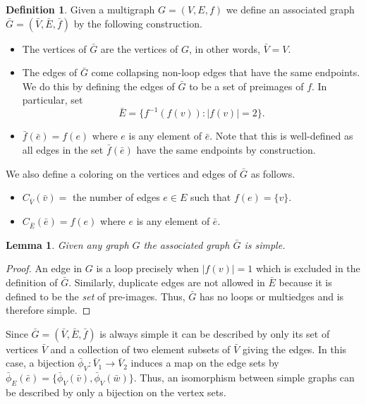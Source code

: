\documentclass[amsmath,secnumarabic,floatfix,amssymb,nofootinbib,nobibnotes,letterpaper,11pt,tightenlines,showkeys]{revtex4}
\newtheorem{lemma}[theorem]{Lemma}
\theoremstyle{definition}
\newtheorem{definition}[theorem]{Definition}
\newcommand{\abs}[1]{\lvert#1\rvert}
\let\mgp=\marginpar \marginparwidth18mm \marginparsep1mm
\def\marginpar#1{\mgp{\raggedright\tiny #1}}
\let\lbl=\label
\def\label#1{\lbl{#1}\ifinner\else\marginpar{\ref{#1} #1}\ignorespaces\fi}
\begin{document}
\begin{definition}{\label{gbar}}
	Given a multigraph $G=(V,E,f)$ we define an associated graph $\bar{G} = (\bar{V}, \bar{E}, \bar{f})$ by the following construction. 

	\begin{itemize}
		\item The vertices of $\bar{G}$ are the vertices of $G$, in other words, $\bar{V} = V$.
		\item The edges of $\bar{G}$ come collapsing non-loop edges that have the same endpoints. We do this by defining the edges of $\bar{G}$ to be a set of preimages of $f$. In particular, set $$\bar{E} =  \{f^{-1}(f(v)) : \abs{f(v)} = 2\}.$$
		\item $\bar{f}(\bar{e}) = f(e)$ where $e$ is any element of $\bar{e}$. Note that this is well-defined as all edges in the set $\bar{f}(\bar{e})$ have the same endpoints by construction.
		
	\end{itemize}

	We also define a coloring on the vertices and edges of $\bar{G}$ as follows.
	
	\begin{itemize}
		\item $C_{\bar{V}}(\bar{v}) = $ the number of edges $e \in E$ such that $f(e) = \{v\}$.
		\item $C_{\bar{E}}(\bar{e}) = f(e)$ where $e$ is any element of $\bar{e}$.
	\end{itemize}

\end{definition}

\begin{lemma}
	Given any graph $G$ the associated graph $\bar{G}$ is simple.
\end{lemma}

\begin{proof}
	An edge in $G$ is a loop precisely when $\abs{f(v)} = 1$ which is excluded in the definition of $\bar{G}$. Similarly, duplicate edges are not allowed in $\bar{E}$ because it is defined to be the \emph{set} of pre-images. Thus, $\bar{G}$ has no loops or multiedges and is therefore simple.
\end{proof}

Since $\bar{G} = (\bar{V}, \bar{E}, \bar{f})$ is always simple it can be described by only its set of vertices $\bar{V}$ and a collection of two element subsets of $\bar{V}$ giving the edges. In this case, a bijection $\bar{\phi}_V: \bar{V}_1 \rightarrow \bar{V}_2$ induces a map on the edge sets by $\bar{\phi}_E(\bar{e}) = \{\bar{\phi}_V(\bar{v}),\bar{\phi}_V(\bar{w})\}$. Thus, an isomorphism between simple graphs can be described by only a bijection on the vertex sets.
\end{document}
